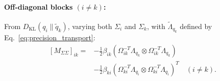 \documentclass[11pt]{article}
\begin{document}
\paragraph{Off-diagonal blocks $(i \neq k)$:} From $D_{\mathrm{KL}}(q_i \| \tilde{q}_k)$, varying both $\Sigma_i$ and $\Sigma_k$, with $\tilde{\Lambda}_{q_k}$ defined by Eq.~\eqref{eq:precision_transport}:
\begin{equation}
\boxed{\begin{aligned}
[M_{\Sigma\Sigma}]_{ik} = &-\frac{1}{2}\beta_{ik}\left(\Omega_{ik}^{-T}\Lambda_{q_k} \otimes \Omega_{ik}^{-T}\Lambda_{q_k}\right) \\
&-\frac{1}{2}\beta_{ki}\left(\Omega_{ki}^{-T}\Lambda_{q_i} \otimes \Omega_{ki}^{-T}\Lambda_{q_i}\right)^T \quad (i \neq k).
\end{aligned}}
\label{eq:mass_sigma_offdiagonal}
\end{equation}
\end{document}
